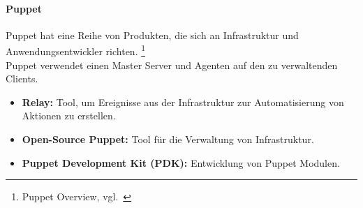 \paragraph{Puppet}\label{iac_tools_tools_puppet}

Puppet hat eine Reihe von Produkten, die sich an Infrastruktur und Anwendungsentwickler richten. \footnote{{Puppet Overview, vgl.~\cite{PUPPET_OVERVIEW}}} \\

Puppet verwendet einen Master Server und Agenten auf den zu verwaltenden Clients.

\begin{itemize}
    \item \textbf{Relay:}
    Tool, um Ereignisse aus der Infrastruktur zur Automatisierung von Aktionen zu erstellen.

    \item \textbf{Open-Source Puppet:}
    Tool für die Verwaltung von Infrastruktur.

    \item \textbf{Puppet Development Kit (PDK):}
    Entwicklung von Puppet Modulen.
\end{itemize}
